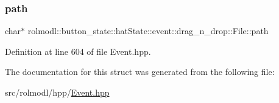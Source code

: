 \subsubsection{\texorpdfstring{path}{path}}
{\footnotesize\ttfamily char$\ast$ rolmodl\+::button\+\_\+state\+::hat\+State\+::event\+::drag\+\_\+n\+\_\+drop\+::\+File\+::path}



Definition at line 604 of file Event.\+hpp.



The documentation for this struct was generated from the following file\+:\begin{DoxyCompactItemize}
\item 
src/rolmodl/hpp/\mbox{\hyperlink{_event_8hpp}{Event.\+hpp}}\end{DoxyCompactItemize}
